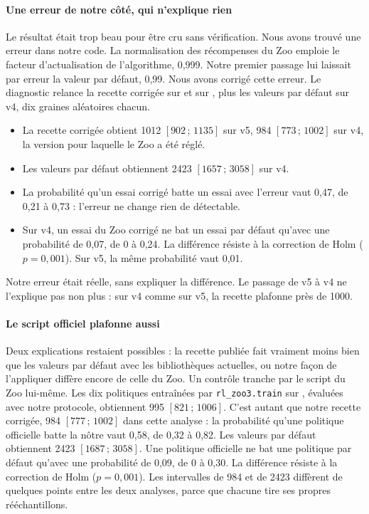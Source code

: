 \paragraph{Une erreur de notre côté, qui n'explique rien}
Le résultat était trop beau pour être cru sans vérification. Nous avons trouvé une erreur dans notre code. La
normalisation des récompenses du Zoo emploie le facteur d'actualisation de l'algorithme, 0,999. Notre premier
passage lui laissait par erreur la valeur par défaut, 0,99. Nous avons corrigé cette erreur. Le diagnostic
relance la recette corrigée sur  et sur , plus les valeurs par défaut sur v4,
dix graines aléatoires chacun.
\begin{itemize}
  \item La recette corrigée obtient \num{1012} $[902\,;\,\num{1135}]$ sur v5, \num{984} $[773\,;\,\num{1002}]$ sur
    v4, la version pour laquelle le Zoo a été réglé.
  \item Les valeurs par défaut obtiennent \num{2423} $[\num{1657}\,;\,\num{3058}]$ sur v4.
  \item La probabilité qu'un essai corrigé batte un essai avec l'erreur vaut 0,47, de 0,21 à 0,73 :
    l'erreur ne change rien de détectable.
  \item Sur v4, un essai du Zoo corrigé ne bat un essai par défaut qu'avec une probabilité de 0,07, de 0 à
    0,24. La différence résiste à la correction de Holm ($p=0{,}001$). Sur v5, la même probabilité vaut 0,01.
\end{itemize}
Notre erreur était réelle, sans expliquer la différence. Le passage de v5 à v4 ne l'explique pas non plus :
sur v4 comme sur v5, la recette plafonne près de \num{1000}.

\paragraph{Le script officiel plafonne aussi}
Deux explications restaient possibles : la recette publiée fait vraiment moins bien que les valeurs par défaut
avec les bibliothèques actuelles, ou notre façon de l'appliquer diffère encore de celle du Zoo. Un contrôle
tranche par le script du Zoo lui-même. Les dix politiques
entraînées par \texttt{rl\_zoo3.train} sur , évaluées avec notre protocole, obtiennent
\num{995} $[821\,;\,\num{1006}]$. C'est autant que notre recette corrigée, \num{984} $[777\,;\,\num{1002}]$ dans
cette analyse : la probabilité qu'une politique officielle batte la nôtre vaut 0,58, de 0,32 à 0,82. Les
valeurs par défaut obtiennent \num{2423} $[\num{1687}\,;\,\num{3058}]$. Une politique officielle ne bat une
politique par défaut qu'avec une probabilité de 0,09, de 0 à 0,30. La différence résiste à la correction de Holm
($p=0{,}001$). Les intervalles de \num{984} et de \num{2423} diffèrent de quelques points entre les deux
analyses, parce que chacune tire ses propres rééchantillons.

